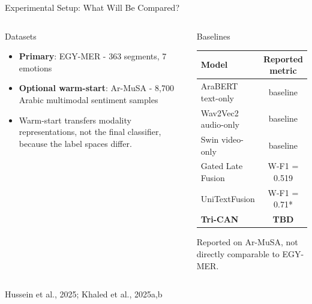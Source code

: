 \documentclass[aspectratio=169,10pt]{beamer}
\newcommand{\term}[1]{\textbf{\textcolor{MidBlue}{#1}}}
\newcommand{\source}[1]{\vspace{0.05cm}\hfill{\scriptsize\textcolor{MutedGray}{#1}}}
\newcommand{\keytake}[1]{\vspace{0.3em}{\small #1}}
\begin{document}
\begin{frame}[t]{Experimental Setup: What Will Be Compared?}
\begin{columns}[T,onlytextwidth]
\begin{block}{Datasets}
\begin{itemize}
  \item \term{Primary}: EGY-MER - 363 segments, 7 emotions
  \item \term{Optional warm-start}: Ar-MuSA - 8,700 Arabic multimodal sentiment samples
  \item Warm-start transfers modality representations, not the final classifier, because the label spaces differ.
\end{itemize}
\end{block}
\begin{block}{Baselines}
\begin{center}
\begin{tabular}{@{}lc@{}}
\toprule
Model & Reported metric \\
\midrule
AraBERT text-only & baseline \\
Wav2Vec2 audio-only & baseline \\
Swin video-only & baseline \\
Gated Late Fusion & W-F1 = 0.519 \\
UniTextFusion & W-F1 = 0.71* \\
\textbf{Tri-CAN} & \textbf{TBD} \\
\bottomrule
\end{tabular}
\end{center}
\vspace{-0.1cm}
{\tiny *Reported on Ar-MuSA, not directly comparable to EGY-MER.}
\end{block}
\end{columns}
\keytake{The fair comparison is Tri-CAN against the EGY-MER gated late fusion baseline; the Ar-MuSA number is only for context.}
\source{Hussein et al., 2025; Khaled et al., 2025a,b}
\end{frame}
\end{document}
